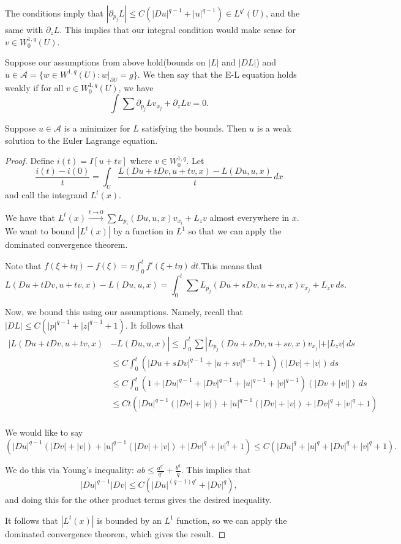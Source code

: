 \documentclass[12pt]{scrartcl}
\newcommand{\<}{\langle}
\renewcommand{\>}{\rangle}
\let \mc \mathcal
\begin{document}
The conditions imply that $|\partial_{p_j} L| \le C(|Du|^{q-1} + |u|^{q-1}) \in L^{q'}(U)$, and the same with $\partial_z L$.  This implies that our integral condition would make sense for $v \in W_0^{1, q}(U)$.  

\begin{definition} Suppose our assumptions from above hold(bounds on $|L|$ and $|DL|$) and $u \in \mc A = \{w \in W^{1, q}(U) : w\vert_{\partial U} = g\}$.  We then say that the E-L equation holds weakly if for all $v \in W_0^{1, q}(U)$, we have 
$$\int \sum \partial_{p_j} L v_{x_j} + \partial_z L v = 0.$$
\end{definition} 

\begin{thm} Suppose $u \in \mc A$ is a minimizer for $L$ satisfying the bounds.  Then $u$ is a weak solution to the Euler Lagrange equation.  
\end{thm}
\begin{proof}
Define $i(t) = I[u + t v]$ where $v \in W_0^{1, q}$.  
Let
$$\frac{i(t) - i(0)}{t} = \int_U \frac{L(Du + tDv, u + tv, x) - L(Du, u, x)}{t}\,dx$$
and call the integrand $L^t(x)$.

We have that $L^t(x) \xrightarrow{t \to 0} \sum L_{p_i}(Du, u, x) v_{x_i} + L_z v$ almost everywhere in $x$.  We want to bound $|L^t(x)|$ by a function in $L^1$ so that we can apply the dominated convergence theorem.   

Note that $f(\xi + t \eta) - f(\xi) = \eta \int_0^t f'(\xi + t\eta)\,dt$.This means that $$L(Du + tDv, u + tv, x) - L(Du, u, x) = \int_0^t \sum L_{p_j}(Du + sDv, u + sv, x) v_{x_j} + L_z v \,ds.$$

Now, we bound this using our assumptions.  Namely, recall that $|DL| \le C(|p|^{q-1} + |z|^{q-1} + 1)$.  It follows that 
\begin{align*}
|L(Du + tDv, u + tv, x) &- L(Du, u, x)| \le \int_0^t \sum |L_{p_j}(Du + sDv, u + sv, x) v_{x_j}| +| L_z v| \,ds \\
&\le C \int_0^t (|Du + sDv|^{q-1} + |u + sv|^{q-1} + 1) (|Dv| + |v|)\,ds \\
&\le C \int_0^t (1 + |Du|^{q-1} + |Dv|^{q-1} + |u|^{q-1} + |v|^{q-1})(|Dv + |v||)\,ds \\
&\le Ct \left ( |Du|^{q-1} (|Dv| + |v|) + |u|^{q-1} (|Dv| + |v|) + |Dv|^q + |v|^q + 1\right )\\
\end{align*}


We would like to say 
$$\left ( |Du|^{q-1} (|Dv| + |v|) + |u|^{q-1} (|Dv| + |v|) + |Dv|^q + |v|^q + 1\right ) \le C \left ( |Du|^{q} + |u|^{q} + |Dv|^q + |v|^q + 1\right ).$$

We do this via Young's inequality: $ab \le \frac{a^{q'}}{q'} + \frac{b^{q}}{q}$.  This implies that 
$$|Du|^{q-1}|Dv| \le C (|Du|^{(q-1)q'} + |Dv|^{q}),$$
and doing this for the other product terms gives the desired inequality.

It follows that $|L^t(x)|$ is bounded by an $L^1$ function, so we can apply the dominated convergence theorem, which gives the result.
\end{proof}
\end{document}
